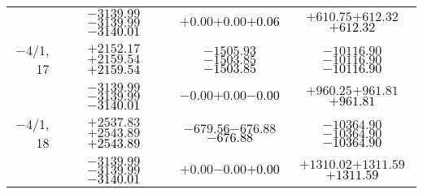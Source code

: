 \documentclass[compress]{beamer}
\begin{document}
\begin{frame}
{\begin{tabular}{r | c | c | c}
           & $-3139.99$\hspace{0.1 cm}$-3139.99$\hspace{0.1 cm}\textcolor{black}{$-3140.01$} & $+0.00$\hspace{0.1 cm}$+0.00$\hspace{0.1 cm}\textcolor{black}{$+0.06$} & $+610.75$\hspace{0.1 cm}$+612.32$\hspace{0.1 cm}\textcolor{black}{$+612.32$} \\
$-$4/1, 17 & $+2152.17$\hspace{0.1 cm}$+2159.54$\hspace{0.1 cm}\textcolor{black}{$+2159.54$} & $-1505.93$\hspace{0.1 cm}$-1503.85$\hspace{0.1 cm}\textcolor{black}{$-1503.85$} & $-10116.90$\hspace{0.1 cm}$-10116.90$\hspace{0.1 cm}\textcolor{black}{$-10116.90$} \\
           & $-3139.99$\hspace{0.1 cm}$-3139.99$\hspace{0.1 cm}\textcolor{black}{$-3140.01$} & $-0.00$\hspace{0.1 cm}$+0.00$\hspace{0.1 cm}\textcolor{black}{$-0.00$} & $+960.25$\hspace{0.1 cm}$+961.81$\hspace{0.1 cm}\textcolor{black}{$+961.81$} \\
$-$4/1, 18 & $+2537.83$\hspace{0.1 cm}$+2543.89$\hspace{0.1 cm}\textcolor{black}{$+2543.89$} & $-679.56$\hspace{0.1 cm}$-676.88$\hspace{0.1 cm}\textcolor{black}{$-676.88$} & $-10364.90$\hspace{0.1 cm}$-10364.90$\hspace{0.1 cm}\textcolor{black}{$-10364.90$} \\
           & $-3139.99$\hspace{0.1 cm}$-3139.99$\hspace{0.1 cm}\textcolor{black}{$-3140.01$} & $+0.00$\hspace{0.1 cm}$-0.00$\hspace{0.1 cm}\textcolor{black}{$+0.00$} & $+1310.02$\hspace{0.1 cm}$+1311.59$\hspace{0.1 cm}\textcolor{black}{$+1311.59$} \\
\end{tabular}}
\label{numpages}
\end{frame}
\end{document}

